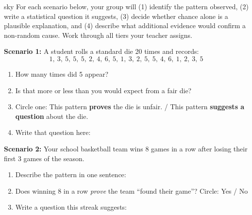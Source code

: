 \documentclass[10pt]{article}
\begin{document}
\namepartnerperiod

\vspace{0.1in}

\begin{scenariobox}[Context]{sky}
\small
For each scenario below, your group will (1) identify the pattern observed, (2) write a
statistical question it suggests, (3) decide whether chance alone is a plausible
explanation, and (4) describe what additional evidence would confirm a non-random cause.
Work through all tiers your teacher assigns.
\end{scenariobox}

\vspace{0.1in}

\begin{tcolorbox}[colback=goldbg, colframe=goldacc, boxrule=1pt, arc=2mm,
    left=4mm, right=4mm, top=3mm, bottom=3mm,
    title={\bfseries Tier R \enspace Remediate --- Getting Started with Patterns}]
\small

\textbf{Scenario 1:} A student rolls a standard die 20 times and records:
\[
1,\ 3,\ 5,\ 5,\ 5,\ 2,\ 4,\ 6,\ 5,\ 1,\ 3,\ 2,\ 5,\ 5,\ 4,\ 6,\ 1,\ 2,\ 3,\ 5
\]

\begin{enumerate}[leftmargin=1.5em, itemsep=8pt]
  \item How many times did 5 appear? \blank{3cm}
  \item Is that more or less than you would expect from a fair die?\\
        \writeline
  \item Circle one: \quad This pattern \textbf{proves} the die is unfair. \quad /
        \quad This pattern \textbf{suggests a question} about the die.
  \item Write that question here: \writeline\writeline
\end{enumerate}

\vspace{8pt}
\textbf{Scenario 2:} Your school basketball team wins 8 games in a row after losing
their first 3 games of the season.

\begin{enumerate}[leftmargin=1.5em, itemsep=8pt]
  \item Describe the pattern in one sentence: \writeline
  \item Does winning 8 in a row \emph{prove} the team ``found their game''? Circle: Yes / No
  \item Write a question this streak suggests: \writeline\writeline
\end{enumerate}

\end{tcolorbox}
\end{document}
